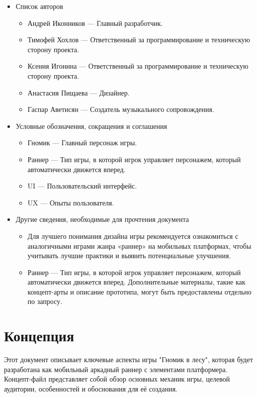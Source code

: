 \documentclass{article}
\begin{document}
\begin{itemize}
\item Список авторов
	\begin{itemize}
		\item Андрей Иконников — Главный разработчик.
		\item Тимофей Хохлов — Ответственный за программирование и техническую сторону проекта.
		\item Ксения Игонина — Ответственный за программирование и техническую сторону проекта.
		\item Анастасия Пищаева — Дизайнер.
		\item Гаспар Аветисян — Создатель музыкального сопровождения.
	\end{itemize}

\item Условные обозначения, сокращения и соглашения
	\begin{itemize}
            \item Гномик — Главный персонаж игры.
            \item Раннер — Тип игры, в которой игрок управляет персонажем, который автоматически движется вперед.
            \item UI — Пользовательский интерфейс.
            \item UX — Опыты пользователя.
	\end{itemize}

\item Другие сведения, необходимые для прочтения документа
	\begin{itemize}
            \item Для лучшего понимания дизайна игры рекомендуется ознакомиться с аналогичными играми жанра «раннер» на мобильных платформах, чтобы учитывать лучшие практики и выявить потенциальные улучшения.
            \item Раннер — Тип игры, в которой игрок управляет персонажем, который автоматически движется вперед.
            Дополнительные материалы, такие как концепт-арты и описание прототипа, могут быть предоставлены отдельно по запросу.
	\end{itemize}
\end{itemize}

\section{Концепция}

Этот документ описывает ключевые аспекты игры "Гномик в лесу", которая будет разработана как мобильный аркадный раннер с элементами платформера. Концепт-файл представляет собой обзор основных механик игры, целевой аудитории, особенностей и обоснования для её создания.
\end{document}
